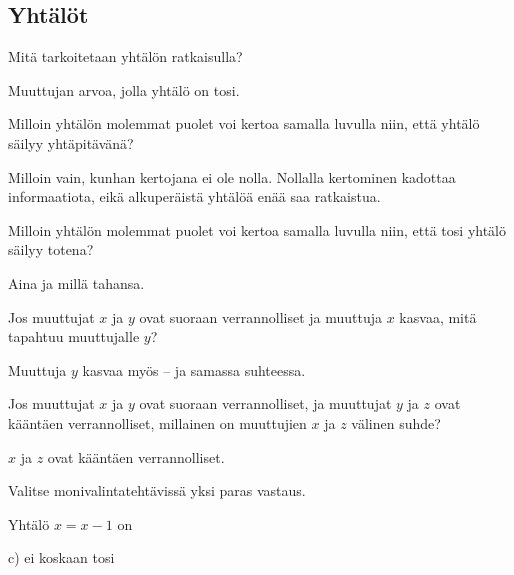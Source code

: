 \subsection*{Yhtälöt}

\begin{tehtava}
Mitä tarkoitetaan yhtälön ratkaisulla?
\begin{vastaus}
Muuttujan arvoa, jolla yhtälö on tosi.
\end{vastaus}
\end{tehtava}

\begin{tehtava}
Milloin yhtälön molemmat puolet voi kertoa samalla luvulla niin, että yhtälö säilyy yhtäpitävänä?
\begin{vastaus}
Milloin vain, kunhan kertojana ei ole nolla. Nollalla kertominen kadottaa informaatiota, eikä alkuperäistä yhtälöä enää saa ratkaistua.
\end{vastaus}
\end{tehtava}

\begin{tehtava}
Milloin yhtälön molemmat puolet voi kertoa samalla luvulla niin, että tosi yhtälö säilyy totena?
\begin{vastaus}
Aina ja millä tahansa.
\end{vastaus}
\end{tehtava}

\begin{tehtava}
Jos muuttujat $x$ ja $y$ ovat suoraan verrannolliset ja muuttuja $x$ kasvaa, mitä tapahtuu muuttujalle $y$?
\begin{vastaus}
Muuttuja $y$ kasvaa myös -- ja samassa suhteessa.
\end{vastaus}
\end{tehtava}

\begin{tehtava}
Jos muuttujat $x$ ja $y$ ovat suoraan verrannolliset, ja muuttujat $y$ ja $z$ ovat kääntäen verrannolliset, millainen on muuttujien $x$ ja $z$ välinen suhde?
\begin{vastaus}
$x$ ja $z$ ovat kääntäen verrannolliset.
\end{vastaus}
\end{tehtava}


Valitse monivalintatehtävissä yksi paras vastaus.

\begin{tehtava}
Yhtälö $x = x-1$ on
\begin{alakohdat}
\end{alakohdat}
\begin{vastaus}
c) ei koskaan tosi
\end{vastaus}
\end{tehtava}

